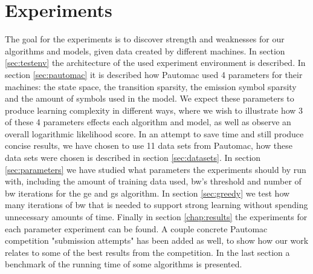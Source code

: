 \chapter{Experiments}
\label{chap:experiments}
The goal for the experiments is to discover strength and weaknesses for our algorithms and models, given data created by different machines. In section \ref{sec:testenv} the architecture of the used experiment environment is described. In section \ref{sec:pautomac} it is described how Pautomac used 4 parameters for their machines: the state space, the transition sparsity, the emission symbol sparsity and the amount of symbols used in the model. We expect these parameters to produce learning complexity in different ways, where we wish to illustrate how 3 of these 4 parameters effects each algorithm and model, as well as observe an overall logarithmic likelihood score. In an attempt to save time and still produce concise results, we have chosen to use 11 data sets from Pautomac, how these data sets were chosen is described in section \ref{sec:datasets}. In section \ref{sec:parameters} we have studied what parameters the experiments should by run with, including the amount of training data used, \gls{bw}'s threshold and number of \gls{bw} iterations for the \gls{ge} and \gls{gs} algorithm. In section \ref{sec:greedy} we test how many iterations of \gls{bw} that is needed to support strong learning without spending unnecessary amounts of time.
Finally in section \ref{chap:results} the experiments for each parameter experiment can be found. A couple concrete Pautomac competition "submission attempts" has been added as well, to show how our work relates to some of the best results from the competition. In the last section a benchmark of the running time of some algorithms is presented.

%



\FloatBarrier


